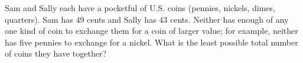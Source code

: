Sam and Sally each have a pocketful of U.S. coins (pennies, nickels, dimes, quarters). Sam has $49$ cents and Sally has $43$ cents. Neither has enough of any one kind of coin to exchange them for a coin of larger value; for example, neither has five pennies to exchange for a nickel. What is the least possible total number of coins they have together?

